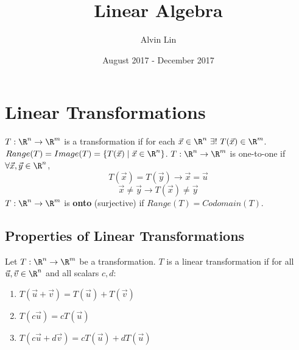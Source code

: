 \documentclass[letterpaper, 12pt]{math}
\title{Linear Algebra}
\author{Alvin Lin}
\date{August 2017 - December 2017}
\begin{document}
\maketitle

\section*{Linear Transformations}
\( T:\R^n\to\R^m \) is a transformation if for each \( \vec{x}\in\R^n~\exists!~
T(\vec{x})\in\R^m \). \( Range(T) = Image(T) = \{T(\vec{x})\mid\vec{x}\in\R^n\}
\). \( T:\R^n\to\R^m \) is one-to-one if \( \forall\vec{x},\vec{y}\in\R^n \),
\[ T(\vec{x}) = T(\vec{y}) \longrightarrow \vec{x} = \vec{u} \]
\[ \vec{x} \ne \vec{y} \longrightarrow T(\vec{x}) \ne \vec{y} \]
\( T:\R^n\to\R^m \) is \textbf{onto} (surjective) if \( Range(T) = Codomain(T)
\).

\subsection*{Properties of Linear Transformations}
Let \( T:\R^n\to\R^m \) be a transformation. \( T \) is a linear transformation
if for all \( \vec{u},\vec{v}\in\R^n \) and all scalars \( c,d \):
\begin{enumerate}
  \item \( T(\vec{u}+\vec{v}) = T(\vec{u})+T(\vec{v}) \)
  \item \( T(c\vec{u}) = cT(\vec{u}) \)
  \item \( T(c\vec{u}+d\vec{v}) = cT(\vec{u})+dT(\vec{u}) \)
\end{enumerate}
\end{document}
